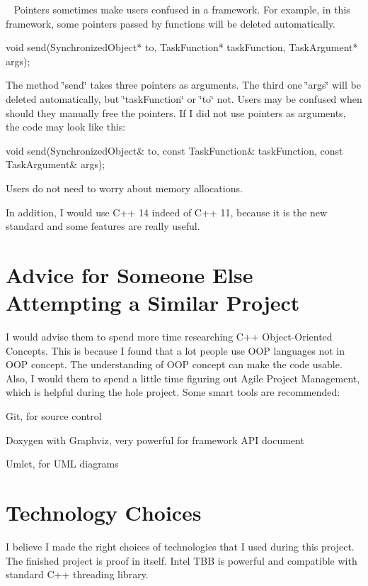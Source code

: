 ~\newline
Pointers sometimes make users confused in a framework. For example, in this framework, some pointers passed by functions will be deleted automatically. 
\begin{DoxyCode}
\textcolor{keywordtype}{void} send(SynchronizedObject* to,
          TaskFunction* taskFunction,
          TaskArgument* args);
\end{DoxyCode}
 The method \char`\"{}send\char`\"{} takes three pointers as arguments. The third one \char`\"{}args\char`\"{} will be deleted automatically, but \char`\"{}task\+Function\char`\"{} or \char`\"{}to\char`\"{} not. Users may be confused when should they manually free the pointers. If I did not use pointers as arguments, the code may look like this\+: 
\begin{DoxyCode}
\textcolor{keywordtype}{void} send(SynchronizedObject& to,
          \textcolor{keyword}{const} TaskFunction& taskFunction,
          \textcolor{keyword}{const} TaskArgument& args);
\end{DoxyCode}
 Users do not need to worry about memory allocations.

In addition, I would use C++ 14 indeed of C++ 11, because it is the new standard and some features are really useful.\hypertarget{_reviewof_project_ReviewofProjectAdviceforSomeoneElseAttemptingaSimilarProject}{}\section{Advice for Someone Else Attempting a Similar Project}\label{_reviewof_project_ReviewofProjectAdviceforSomeoneElseAttemptingaSimilarProject}
I would advise them to spend more time researching C++ Object-\/\+Oriented Concepts. This is because I found that a lot people use O\+O\+P languages not in O\+O\+P concept. The understanding of O\+O\+P concept can make the code usable. Also, I would them to spend a little time figuring out Agile Project Management, which is helpful during the hole project. Some smart tools are recommended\+:
\begin{DoxyItemize}
\item Git, for source control
\item Doxygen with Graphviz, very powerful for framework A\+P\+I document
\item Umlet, for U\+M\+L diagrams
\end{DoxyItemize}\hypertarget{_reviewof_project_ReviewofProjectTechnologyChoices}{}\section{Technology Choices}\label{_reviewof_project_ReviewofProjectTechnologyChoices}
I believe I made the right choices of technologies that I used during this project. The finished project is proof in itself. Intel T\+B\+B is powerful and compatible with standard C++ threading library. 